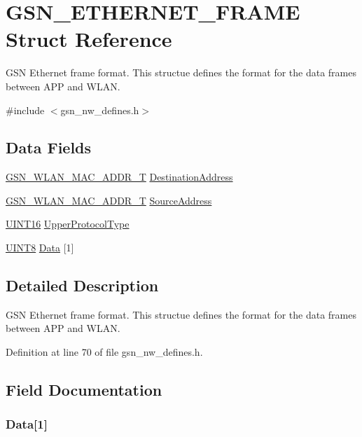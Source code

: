 \hypertarget{a00068}{
\section{GSN\_\-ETHERNET\_\-FRAME Struct Reference}
\label{a00068}
}


GSN Ethernet frame format. This structue defines the format for the data frames between APP and WLAN.  




{\ttfamily \#include $<$gsn\_\-nw\_\-defines.h$>$}

\subsection*{Data Fields}
\begin{DoxyCompactItemize}
\item 
\hyperlink{a00416}{GSN\_\-WLAN\_\-MAC\_\-ADDR\_\-T} \hyperlink{a00068_a3b152d0996ae1d37bcef7cccaf86af80}{DestinationAddress}
\item 
\hyperlink{a00416}{GSN\_\-WLAN\_\-MAC\_\-ADDR\_\-T} \hyperlink{a00068_a3c640ec8c496dd2a67910cef704b09ae}{SourceAddress}
\item 
\hyperlink{a00660_ga09f1a1fb2293e33483cc8d44aefb1eb1}{UINT16} \hyperlink{a00068_aca61d6fc189d448598d7052324f08fcc}{UpperProtocolType}
\item 
\hyperlink{a00660_gab27e9918b538ce9d8ca692479b375b6a}{UINT8} \hyperlink{a00068_a99f0059bd35421220a25a006606cb767}{Data} \mbox{[}1\mbox{]}
\end{DoxyCompactItemize}


\subsection{Detailed Description}
GSN Ethernet frame format. This structue defines the format for the data frames between APP and WLAN. 

Definition at line 70 of file gsn\_\-nw\_\-defines.h.



\subsection{Field Documentation}
\hypertarget{a00068_a99f0059bd35421220a25a006606cb767}{
\subsubsection[{Data}]{ {\bf Data}\mbox{[}1\mbox{]}}}
\label{a00068_a99f0059bd35421220a25a006606cb767}



